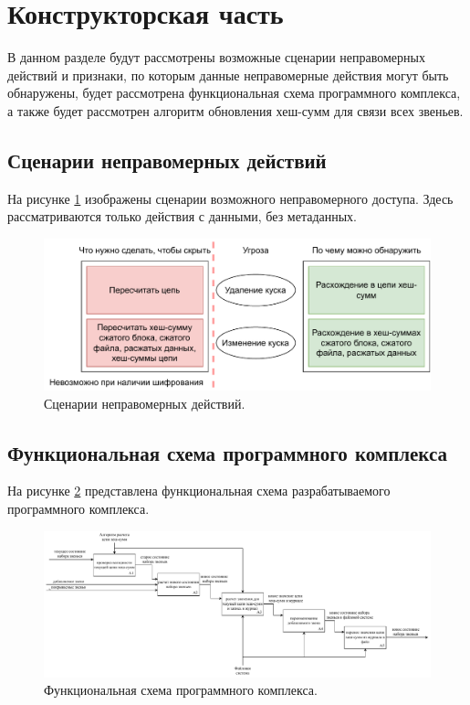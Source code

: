 \section{Конструкторская часть}

В данном разделе будут рассмотрены возможные сценарии неправомерных действий и признаки, по которым данные неправомерные действия могут быть обнаружены, будет рассмотрена функциональная схема программного комплекса, а также будет рассмотрен алгоритм обновления хеш-сумм для связи всех звеньев.

\subsection{Сценарии неправомерных действий}

На рисунке \ref{fig:scenarios} изображены сценарии возможного неправомерного доступа. Здесь рассматриваются только действия с данными, без метаданных.

\begin{figure}[hbtp]
	\centering
	\includegraphics[width=\textwidth]{img/scenarios.pdf}
	\caption{Сценарии неправомерных действий.}
	\label{fig:scenarios}
\end{figure}

\subsection{Функциональная схема программного комплекса}

На рисунке \ref{fig:idef} представлена функциональная схема разрабатываемого программного комплекса.

\begin{figure}[hbtp]
	\centering
	\includegraphics[width=\textwidth]{img/idef.pdf}
	\caption{Функциональная схема программного комплекса.}
	\label{fig:idef}
\end{figure}

